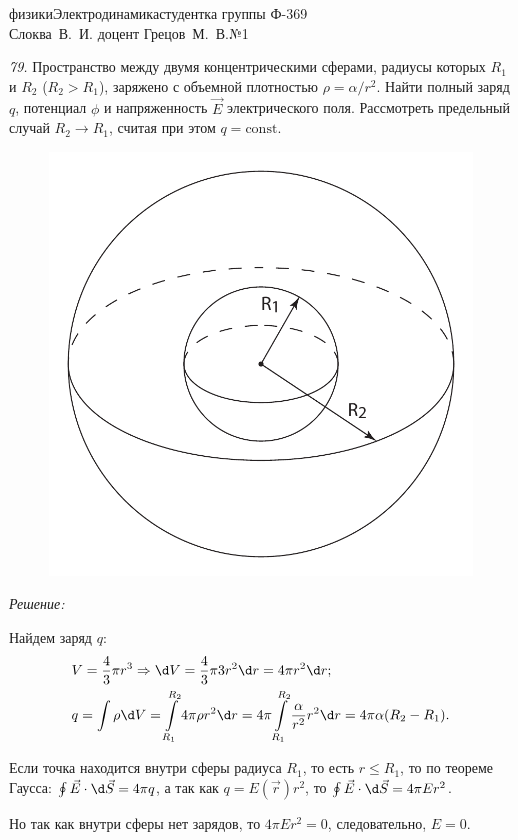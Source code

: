 



{физики}{Электродинамика}{студентка группы Ф-369\\Слоква~В.~И.}
{доцент Грецов~М.~В.}{№1}

\renewcommand{\labelenumi}{\asbuk{enumi})}
\renewcommand{\v}{\mathrm{v}}
\renewcommand{\div}{\mathrm{div\ }}
\newcommand{\grad}{\mathrm{grad\ }}

\newpage
\emph{79.} Пространство между двумя концентрическими сферами, радиусы которых
\( R_1 \) и \( R_2 \) (\( R_2 > R_1 \)), заряжено с объемной плотностью
\( \rho = \alpha/r^2 \). Найти полный заряд \( q \), потенциал \( \phi \) и
напряженность \( \vec{E} \) электрического поля. Рассмотреть предельный случай
\( R_2 \to R_1 \), считая при этом \( q = \mathrm{const} \).

\vspace*{2em}
\begin{figure}[h!]
    \center
    \includegraphics[width=.35\textwidth]{1-1}
\end{figure}
\emph{Решение:}

Найдем заряд \( q \):
\begin{align*}
    & V = \frac{4}{3}\pi r^3 \Rightarrow \d V = \frac{4}{3}\pi 3r^2\d r =
    4\pi r^2\d r; \\
    & q = \int\rho\d V = \int\limits_{R_1}^{R_2} 4\pi\rho r^2\d r = 4\pi \int
    \limits_{R_1}^{R_2} \frac{\alpha}{r^2} r^2\d r = 4\pi\alpha (R_2 - R_1).
\end{align*}

Если точка находится внутри сферы радиуса \( R_1 \), то есть \( r \le R_1 \), то
по теореме Гаусса: \( \oint \vec{E}\cdot\d\vec{S} = 4\pi q \), а так как
\( q = E(\vec{r})r^2 \), то \( \oint \vec{E}\cdot\d\vec{S} = 4\pi E r^2 \).

Но так как внутри сферы нет зарядов, то \( 4\pi E r^2 = 0 \), следовательно,
\( E = 0 \).

